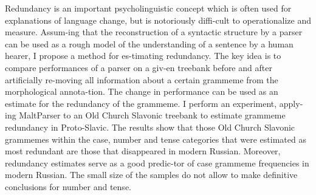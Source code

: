 Redundancy is an important psycholinguistic concept which is often used for explanations of language change, but is notoriously diffi-cult to operationalize and measure. Assum-ing that the reconstruction of a syntactic structure by a parser can be used as a rough model of the understanding of a sentence by a human hearer, I propose a method for es-timating redundancy. The key idea is to compare performances of a parser on a giv-en treebank before and after artificially re-moving all information about a certain grammeme from the morphological annota-tion. The change in performance can be used as an estimate for the redundancy of the grammeme. I perform an experiment, apply-ing MaltParser to an Old Church Slavonic treebank to estimate grammeme redundancy in Proto-Slavic. The results show that those Old Church Slavonic grammemes within the case, number and tense categories that were estimated as most redundant are those that disappeared in modern Russian. Moreover, redundancy estimates serve as a good predic-tor of case grammeme frequencies in modern Russian. The small size of the samples do not allow to make definitive conclusions for number and tense.
